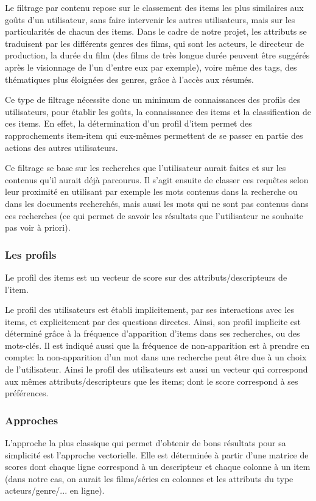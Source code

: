 \documentclass{article}
\begin{document}
Le filtrage par contenu repose sur le classement des items les plus similaires aux goûts d'un utilisateur, sans faire intervenir les autres utilisateurs, mais sur les particularités de chacun des items. Dans le cadre de notre projet, les attributs se traduisent par les différents genres des films, qui sont les acteurs, le directeur de production, la durée du film (des films de très longue durée peuvent être suggérés après le visionnage de l'un d'entre eux par exemple), voire même des tags, des thématiques plus éloignées des genres, grâce à l'accès aux résumés. 

Ce type de filtrage nécessite donc un minimum de connaissances des profils des utilisateurs, pour établir les goûts, la connaissance des items et la classification de ces items. En effet, la détermination d'un profil d'item permet des rapprochements item-item qui eux-mêmes permettent de se passer en partie des actions des autres utilisateurs. 

Ce filtrage se base sur les recherches que l'utilisateur aurait faites et sur les contenus qu'il aurait déjà parcourus. Il s'agit ensuite de classer ces requêtes selon leur proximité en utilisant par exemple les mots contenus dans la recherche ou dans les documents recherchés, mais aussi les mots qui ne sont pas contenus dans ces recherches (ce qui permet de savoir les résultats que l'utilisateur ne souhaite pas voir à priori).

\subsubsection{Les profils}

Le profil des items est un vecteur de score sur des attributs/descripteurs de l'item.

Le profil des utilisateurs est établi implicitement, par ses interactions avec les items, et explicitement par des questions directes. Ainsi, son profil implicite est déterminé grâce à la fréquence d'apparition d'items dans ses recherches, ou des mots-clés. Il est indiqué aussi que la fréquence de non-apparition est à prendre en compte: la non-apparition d'un mot dans une recherche peut être due à un choix de l'utilisateur. Ainsi le profil des utilisateurs est aussi un vecteur qui correspond aux mêmes attributs/descripteurs que les items; dont le score correspond à ses préférences.
\subsubsection{Approches}
L'approche la plus classique qui permet d'obtenir de bons résultats pour sa simplicité est l'approche vectorielle.
Elle est déterminée à partir d'une matrice de scores dont chaque ligne correspond à un descripteur et chaque colonne à un item (dans notre cas, on aurait les films/séries en colonnes et les attributs du type acteurs/genre/... en ligne).
\end{document}
